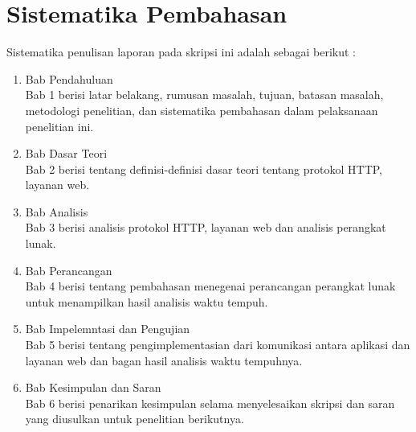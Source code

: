 \section{Sistematika Pembahasan}
\label{sec:sispem}
Sistematika penulisan laporan pada skripsi ini adalah sebagai berikut :
\begin{enumerate}
	\item Bab Pendahuluan\\
	Bab 1 berisi latar belakang, rumusan masalah, tujuan, batasan masalah, metodologi penelitian, dan sistematika pembahasan dalam pelaksanaan penelitian ini.
	\item Bab Dasar Teori\\
	Bab 2 berisi tentang definisi-definisi dasar teori tentang protokol HTTP, layanan web.
	\item Bab Analisis\\
	Bab 3 berisi analisis protokol HTTP, layanan web dan analisis perangkat lunak.
	\item Bab Perancangan\\
	Bab 4 berisi tentang pembahasan menegenai perancangan perangkat lunak untuk menampilkan hasil analisis waktu tempuh.
	\item Bab Impelemntasi dan Pengujian\\
	Bab 5 berisi tentang pengimplementasian dari komunikasi antara aplikasi dan layanan web dan bagan hasil analisis waktu tempuhnya.
	\item Bab Kesimpulan dan Saran\\
	Bab 6 berisi penarikan kesimpulan selama menyelesaikan skripsi dan saran yang diusulkan untuk penelitian berikutnya.
\end{enumerate}